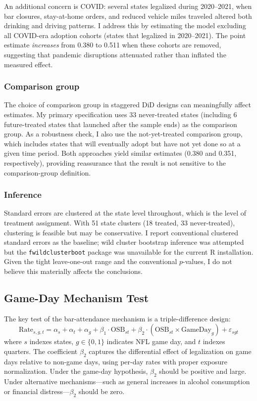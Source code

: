 \documentclass[12pt]{article}
\begin{document}
An additional concern is COVID: several states legalized during 2020--2021, when bar closures, stay-at-home orders, and reduced vehicle miles traveled altered both drinking and driving patterns. I address this by estimating the model excluding all COVID-era adoption cohorts (states that legalized in 2020--2021). The point estimate \textit{increases} from 0.380 to 0.511 when these cohorts are removed, suggesting that pandemic disruptions attenuated rather than inflated the measured effect.

\subsubsection*{Comparison group} The choice of comparison group in staggered DiD designs can meaningfully affect estimates. My primary specification uses 33 never-treated states (including 6 future-treated states that launched after the sample ends) as the comparison group. As a robustness check, I also use the not-yet-treated comparison group, which includes states that will eventually adopt but have not yet done so at a given time period. Both approaches yield similar estimates (0.380 and 0.351, respectively), providing reassurance that the result is not sensitive to the comparison-group definition.

\subsubsection*{Inference} Standard errors are clustered at the state level throughout, which is the level of treatment assignment. With 51 state clusters (18 treated, 33 never-treated), clustering is feasible but may be conservative. I report conventional clustered standard errors as the baseline; wild cluster bootstrap inference was attempted but the \texttt{fwildclusterboot} package was unavailable for the current R installation. Given the tight leave-one-out range and the conventional $p$-values, I do not believe this materially affects the conclusions.

\subsection{Game-Day Mechanism Test}

The key test of the bar-attendance mechanism is a triple-difference design:
\begin{equation}
\text{Rate}_{s,g,t} = \alpha_s + \alpha_t + \alpha_g + \beta_1 \cdot \text{OSB}_{st} + \beta_2 \cdot (\text{OSB}_{st} \times \text{GameDay}_g) + \varepsilon_{sgt}
\label{eq:ddd}
\end{equation}
where $s$ indexes states, $g \in \{0,1\}$ indicates NFL game day, and $t$ indexes quarters. The coefficient $\beta_2$ captures the differential effect of legalization on game days relative to non-game days, using per-day rates with proper exposure normalization. Under the game-day hypothesis, $\beta_2$ should be positive and large. Under alternative mechanisms---such as general increases in alcohol consumption or financial distress---$\beta_2$ should be zero.
\end{document}
